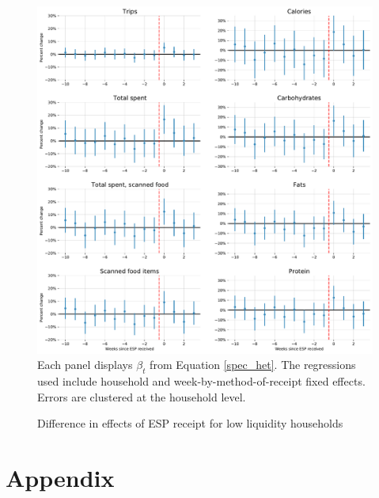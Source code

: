 \documentclass[12pt]{article}
\begin{document}
\clearpage
\begin{figure}[t]
\begin{center}
\caption{Difference in effects of ESP receipt for low liquidity households}
\label{es_interaction}
\includegraphics[width=1\textwidth, angle=0]{../figures/es_interaction.pdf}
\footnotesize Each panel displays $\beta_t$ from Equation \ref{spec_het}. The regressions used include household and week-by-method-of-receipt fixed effects. Errors are clustered at the household level. \end{center}
\end{figure}


\clearpage
\section*{Appendix}

\renewcommand{\thesubsection}{\Alph{subsection}}
\setcounter{table}{0}
\renewcommand{\thetable}{A\arabic{table}}
\setcounter{figure}{0}
\renewcommand{\thefigure}{A\arabic{figure}}


% 
\end{document}
